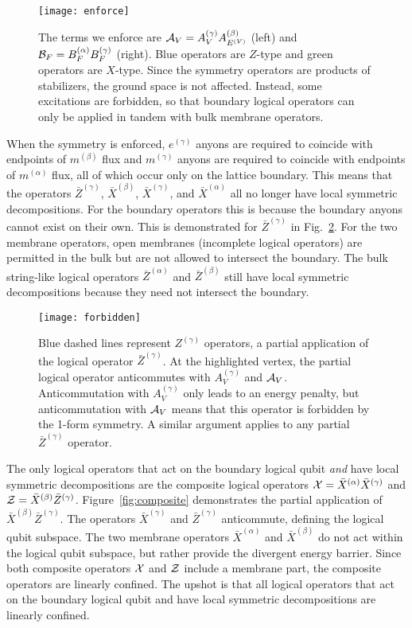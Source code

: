 \begin{figure}
\centering
\texttt{[image: enforce]}
\caption[The terms we enforce]{The terms we enforce are $\cal{A}_V = A_V^{(\gamma)} A_{E^{(V)}}^{(\beta)}$ (left) and $\cal{B}_F = B_F^{(\alpha)} B_F^{(\gamma)}$ (right). Blue operators are $Z$-type and green operators are $X$-type. Since the symmetry operators are products of stabilizers, the ground space is not affected. Instead, some excitations are forbidden, so that boundary logical operators can only be applied in tandem with bulk membrane operators.}
\label{fig:enforced}
\end{figure}

When the symmetry is enforced, $e^{(\gamma)}$ anyons are required to coincide with endpoints of $m^{(\beta)}$ flux and $m^{(\gamma)}$ anyons are required to coincide with endpoints of $m^{(\alpha)}$ flux, all of which occur only on the lattice boundary. This means that the operators $\bar{Z}^{(\gamma)}$, $\bar{X}^{(\beta)}$, $\bar{X}^{(\gamma)}$, and $\bar{X}^{(\alpha)}$ all no longer have local symmetric decompositions.  For the boundary operators this is because the boundary anyons cannot exist on their own. This is demonstrated for $\bar{Z}^{(\gamma)}$ in Fig.~\ref{fig:forbidden}. For the two membrane operators, open membranes (incomplete logical operators) are permitted in the bulk but  are not allowed to intersect the boundary. The bulk string-like logical operators $\bar{Z}^{(\alpha)}$ and $\bar{Z}^{(\beta)}$ still have local symmetric decompositions because they need not intersect the boundary. 

\begin{figure}[th!]
\centering
\texttt{[image: forbidden]}
\caption[A forbidden operator]{Blue dashed lines represent $Z^{(\gamma)}$ operators, a partial application of the logical operator $\bar{Z}^{(\gamma)}$. At the highlighted vertex, the partial logical operator anticommutes with $A_V^{(\gamma)}$ and $\cal{A}_V$. Anticommutation with $A_V^{(\gamma)}$ only leads to an energy penalty, but anticommutation with $\cal{A}_V$ means that this operator is forbidden by the 1-form symmetry. A similar argument applies to any partial $\bar{Z}^{(\gamma)}$ operator.}
\label{fig:forbidden}
\end{figure}

The only logical operators that act on the boundary logical qubit \emph{and} have local symmetric decompositions are the composite logical operators $\cal{X}=\bar{X}^{(\alpha)} \bar{X}^{(\gamma)}$ and $\cal{Z}=\bar{X}^{(\beta)} \bar{Z}^{(\gamma)}$. Figure~\ref{fig:composite} demonstrates the partial application of $\bar{X}^{(\beta)} \bar{Z}^{(\gamma)}$. The operators $\bar{X}^{(\gamma)}$ and $\bar{Z}^{(\gamma)}$ anticommute, defining the logical qubit subspace. The two membrane operators $\bar{X}^{(\alpha)}$ and $\bar{X}^{(\beta)}$ do not act within the logical qubit subspace, but rather provide the divergent energy barrier.
Since both composite operators $\cal{X}$ and $\cal{Z}$ include a membrane part, the composite operators are linearly confined. The upshot is that all logical operators that act on the boundary logical qubit and have local symmetric decompositions are linearly confined. 

